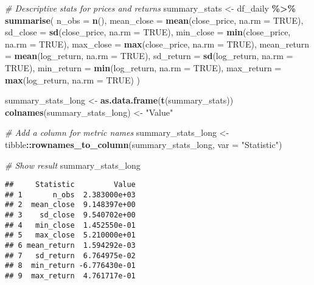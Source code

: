 \documentclass[
  12pt,
]{article}
\newenvironment{Shaded}{\begin{snugshade}}{\end{snugshade}}
\newcommand{\AttributeTok}[1]{\textcolor[rgb]{0.13,0.29,0.53}{#1}}
\newcommand{\CommentTok}[1]{\textcolor[rgb]{0.56,0.35,0.01}{\textit{#1}}}
\newcommand{\ConstantTok}[1]{\textcolor[rgb]{0.56,0.35,0.01}{#1}}
\newcommand{\FunctionTok}[1]{\textcolor[rgb]{0.13,0.29,0.53}{\textbf{#1}}}
\newcommand{\NormalTok}[1]{#1}
\newcommand{\OtherTok}[1]{\textcolor[rgb]{0.56,0.35,0.01}{#1}}
\newcommand{\SpecialCharTok}[1]{\textcolor[rgb]{0.81,0.36,0.00}{\textbf{#1}}}
\newcommand{\StringTok}[1]{\textcolor[rgb]{0.31,0.60,0.02}{#1}}
\begin{document}
\begin{Shaded}
\begin{Highlighting}[]
\CommentTok{\# Descriptive stats for prices and returns}
\NormalTok{summary\_stats }\OtherTok{\textless{}{-}}\NormalTok{ df\_daily }\SpecialCharTok{\%\textgreater{}\%}
  \FunctionTok{summarise}\NormalTok{(}
    \AttributeTok{n\_obs =} \FunctionTok{n}\NormalTok{(),}
    \AttributeTok{mean\_close =} \FunctionTok{mean}\NormalTok{(close\_price, }\AttributeTok{na.rm =} \ConstantTok{TRUE}\NormalTok{),}
    \AttributeTok{sd\_close =} \FunctionTok{sd}\NormalTok{(close\_price, }\AttributeTok{na.rm =} \ConstantTok{TRUE}\NormalTok{),}
    \AttributeTok{min\_close =} \FunctionTok{min}\NormalTok{(close\_price, }\AttributeTok{na.rm =} \ConstantTok{TRUE}\NormalTok{),}
    \AttributeTok{max\_close =} \FunctionTok{max}\NormalTok{(close\_price, }\AttributeTok{na.rm =} \ConstantTok{TRUE}\NormalTok{),}
    \AttributeTok{mean\_return =} \FunctionTok{mean}\NormalTok{(log\_return, }\AttributeTok{na.rm =} \ConstantTok{TRUE}\NormalTok{),}
    \AttributeTok{sd\_return =} \FunctionTok{sd}\NormalTok{(log\_return, }\AttributeTok{na.rm =} \ConstantTok{TRUE}\NormalTok{),}
    \AttributeTok{min\_return =} \FunctionTok{min}\NormalTok{(log\_return, }\AttributeTok{na.rm =} \ConstantTok{TRUE}\NormalTok{),}
    \AttributeTok{max\_return =} \FunctionTok{max}\NormalTok{(log\_return, }\AttributeTok{na.rm =} \ConstantTok{TRUE}\NormalTok{)}
\NormalTok{  )}

\NormalTok{summary\_stats\_long }\OtherTok{\textless{}{-}} \FunctionTok{as.data.frame}\NormalTok{(}\FunctionTok{t}\NormalTok{(summary\_stats))}
\FunctionTok{colnames}\NormalTok{(summary\_stats\_long) }\OtherTok{\textless{}{-}} \StringTok{"Value"}

\CommentTok{\# Add a column for metric names}
\NormalTok{summary\_stats\_long }\OtherTok{\textless{}{-}}\NormalTok{ tibble}\SpecialCharTok{::}\FunctionTok{rownames\_to\_column}\NormalTok{(summary\_stats\_long, }\AttributeTok{var =} \StringTok{"Statistic"}\NormalTok{)}

\CommentTok{\# Show result}
\NormalTok{summary\_stats\_long}
\end{Highlighting}
\end{Shaded}

\begin{verbatim}
##     Statistic         Value
## 1       n_obs  2.383000e+03
## 2  mean_close  9.148397e+00
## 3    sd_close  9.540702e+00
## 4   min_close  1.452550e-01
## 5   max_close  5.210000e+01
## 6 mean_return  1.594292e-03
## 7   sd_return  6.764975e-02
## 8  min_return -6.776430e-01
## 9  max_return  4.761717e-01
\end{verbatim}
\end{document}
